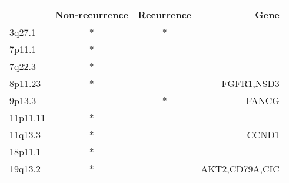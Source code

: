 \begin{tabular}{lccr}
\toprule
{} & Non-recurrence & Recurrence &            Gene \\
\midrule
3q27.1   &              * &          * &                 \\
7p11.1   &              * &            &                 \\
7q22.3   &              * &            &                 \\
8p11.23  &              * &            &      FGFR1,NSD3 \\
9p13.3   &                &          * &           FANCG \\
11p11.11 &              * &            &                 \\
11q13.3  &              * &            &           CCND1 \\
18p11.1  &              * &            &                 \\
19q13.2  &              * &            &  AKT2,CD79A,CIC \\
\bottomrule
\end{tabular}
